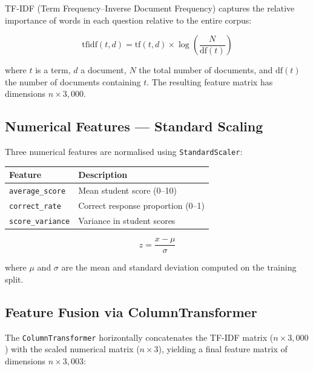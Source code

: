 \documentclass[12pt, a4paper, twoside]{article}
\newcommand{\code}[1]{\texttt{#1}}
\begin{document}
\noindent TF-IDF (Term Frequency--Inverse Document Frequency) captures
the relative importance of words in each question relative to the
entire corpus:

\begin{equation}\label{eq:tfidf}
    \text{tfidf}(t, d) = \text{tf}(t, d) \times
    \log\!\left(\frac{N}{\text{df}(t)}\right)
\end{equation}

\noindent where $t$ is a term, $d$ a document, $N$ the total number of
documents, and $\text{df}(t)$ the number of documents containing $t$.
The resulting feature matrix has dimensions $n \times 3{,}000$.

\subsection{Numerical Features --- Standard Scaling}

Three numerical features are normalised using \code{StandardScaler}:

\begin{center}
\renewcommand{\arraystretch}{1.2}
\begin{tabular}{ll}
    \toprule
    \textbf{Feature} & \textbf{Description} \\
    \midrule
    \code{average\_score}   & Mean student score (0--10) \\
    \code{correct\_rate}    & Correct response proportion (0--1) \\
    \code{score\_variance}  & Variance in student scores \\
    \bottomrule
\end{tabular}
\end{center}

\begin{equation}\label{eq:zscore}
    z = \frac{x - \mu}{\sigma}
\end{equation}

\noindent where $\mu$ and $\sigma$ are the mean and standard deviation
computed on the training split.

\subsection{Feature Fusion via ColumnTransformer}

The \code{ColumnTransformer} horizontally concatenates the TF-IDF
matrix ($n \times 3{,}000$) with the scaled numerical matrix
($n \times 3$), yielding a final feature matrix of dimensions
$n \times 3{,}003$:
\end{document}
